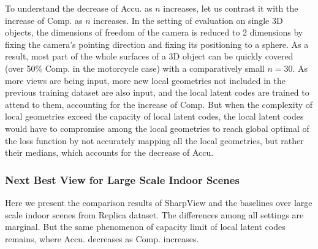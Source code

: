 To understand the decrease of Accu. as $n$ increases, let us contrast it with the increase of Comp. as $n$ increases.
In the setting of evaluation on single 3D objects, the dimensions of freedom of the camera is reduced to 2 dimensions by fixing the camera's pointing direction and fixing its positioning to a sphere.
As a result, most part of the whole surfaces of a 3D object can be quickly covered (over 50\% Comp. in the motorcycle case) with a comparatively small $n=30$.
As more views are being input, more new local geometries not included in the previous training dataset are also input, and the local latent codes are trained to attend to them, accounting for the increase of Comp.
But when the complexity of local geometries exceed the capacity of local latent codes, the local latent codes would have to compromise among the local geometries to reach global optimal of the loss function by not accurately mapping all the local geometries, but rather their medians, which accounts for the decrease of Accu.


\subsubsection{Next Best View for Large Scale Indoor Scenes}
Here we present the comparison results of SharpView and the baselines over large scale indoor scenes from Replica dataset.
The differences among all settings are marginal. But the same phenomenon of capacity limit of local latent codes remains, where Accu. decreases as Comp. increases.

